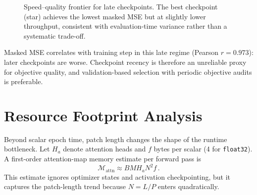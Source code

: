 \documentclass[journal]{IEEEtran}
\begin{document}
\begin{figure}[t]
\centering
{}
\caption{Speed--quality frontier for late checkpoints. The best checkpoint (star) achieves the lowest masked MSE but at slightly lower throughput, consistent with evaluation-time variance rather than a systematic trade-off.}
\label{fig:checkpoint_frontier}
\end{figure}

Masked MSE correlates with training step in this late regime (Pearson $r=0.973$): later checkpoints are worse. Checkpoint recency is therefore an unreliable proxy for objective quality, and validation-based selection with periodic objective audits is preferable.

\section{Resource Footprint Analysis}
Beyond scalar epoch time, patch length changes the shape of the runtime bottleneck. Let $H_a$ denote attention heads and $f$ bytes per scalar (4 for \texttt{float32}). A first-order attention-map memory estimate per forward pass is
\begin{equation}
\mathcal{M}_{\text{attn}} \approx B M H_a N^2 f\,.
\label{eq:attn_mem}
\end{equation}
This estimate ignores optimizer states and activation checkpointing, but it captures the patch-length trend because $N=L/P$ enters quadratically.
\end{document}
